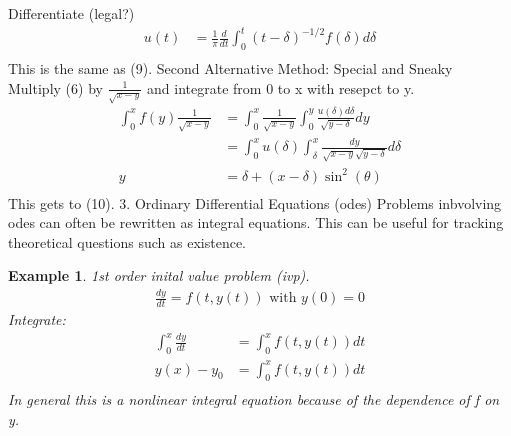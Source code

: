 \documentclass[10pt, oneside]{article}
\newtheorem{example}{Example}
\begin{document}
Differentiate (legal?)
\begin{align*}
    u(t) &= \frac{1}{\pi} \frac{d}{dt} \int_{0}^{t}(t-\delta)^{-1/2} f(\delta) d\delta \\
\end{align*}
This is the same as (9).
Second Alternative Method: Special and Sneaky \\
Multiply (6) by $\frac{1}{\sqrt{x-y}}$ and integrate from 0 to x with resepct to y.
\begin{align*}
    \int_{0}^{x}f(y) \frac{1}{\sqrt{x-y}} & = \int_{0}^{x}\frac{1}{\sqrt{x-y}}\int_{0}^{y}\frac{u(\delta)d\delta}{\sqrt{y-\delta}}dy \\
    &= \int_{0}^{x}u(\delta) \int_{\delta}^{x}\frac{dy}{\sqrt{x-y}\sqrt{y-\delta}}d\delta\\
    y&= \delta+(x-\delta)\sin^{2}(\theta) \\
\end{align*}
This gets to (10).
3. Ordinary Differential Equations (odes)
Problems inbvolving odes can often be rewritten as integral equations. This can be useful for tracking theoretical questions such as existence.
\begin{example}
    1st order inital value problem (ivp).
    \begin{align*}
        \frac{dy}{dt} = f(t,y(t)) \text{ with } y(0) = 0 
    \end{align*}
    Integrate:
    \begin{align*}
        \int_{0}^{x}\frac{dy}{dt} & = \int_{0}^{x}f(t,y(t))dt\\
        y(x) - y_{0} &= \int_{0}^{x}f(t,y(t))dt \\
    \end{align*}
    In general this is a nonlinear integral equation because of the dependence of f on y. 
\end{example}
\end{document}
